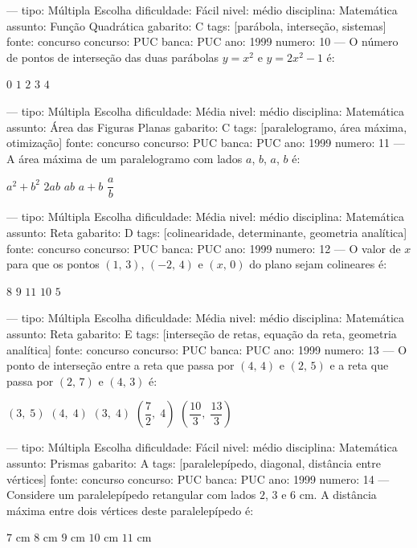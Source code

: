 ---
tipo: Múltipla Escolha
dificuldade: Fácil
nivel: médio
disciplina: Matemática
assunto: Função Quadrática
gabarito: C
tags: [parábola, interseção, sistemas]
fonte: concurso
concurso: PUC
banca: PUC
ano: 1999
numero: 10
---
\question
O número de pontos de interseção das duas parábolas $y = x^2$ e $y = 2x^2 - 1$ é:
\begin{choices}
\choice $0$
\choice $1$
\CorrectChoice $2$
\choice $3$
\choice $4$
\end{choices}

---
tipo: Múltipla Escolha
dificuldade: Média
nivel: médio
disciplina: Matemática
assunto: Área das Figuras Planas
gabarito: C
tags: [paralelogramo, área máxima, otimização]
fonte: concurso
concurso: PUC
banca: PUC
ano: 1999
numero: 11
---
\question
A área máxima de um paralelogramo com lados $a$, $b$, $a$, $b$ é:
\begin{choices}
\choice $a^2 + b^2$
\choice $2ab$
\CorrectChoice $ab$
\choice $a + b$
\choice $\dfrac{a}{b}$
\end{choices}

---
tipo: Múltipla Escolha
dificuldade: Média
nivel: médio
disciplina: Matemática
assunto: Reta
gabarito: D
tags: [colinearidade, determinante, geometria analítica]
fonte: concurso
concurso: PUC
banca: PUC
ano: 1999
numero: 12
---
\question
O valor de $x$ para que os pontos $(1,\,3)$, $(-2,\,4)$ e $(x,\,0)$ do plano sejam colineares é:
\begin{choices}
\choice $8$
\choice $9$
\choice $11$
\CorrectChoice $10$
\choice $5$
\end{choices}

---
tipo: Múltipla Escolha
dificuldade: Média
nivel: médio
disciplina: Matemática
assunto: Reta
gabarito: E
tags: [interseção de retas, equação da reta, geometria analítica]
fonte: concurso
concurso: PUC
banca: PUC
ano: 1999
numero: 13
---
\question
O ponto de interseção entre a reta que passa por $(4,\,4)$ e $(2,\,5)$ e a reta que passa por $(2,\,7)$ e $(4,\,3)$ é:
\begin{choices}
\choice $(3,\;5)$
\choice $(4,\;4)$
\choice $(3,\;4)$
\choice $\left(\dfrac{7}{2},\;4\right)$
\CorrectChoice $\left(\dfrac{10}{3},\;\dfrac{13}{3}\right)$
\end{choices}

---
tipo: Múltipla Escolha
dificuldade: Fácil
nivel: médio
disciplina: Matemática
assunto: Prismas
gabarito: A
tags: [paralelepípedo, diagonal, distância entre vértices]
fonte: concurso
concurso: PUC
banca: PUC
ano: 1999
numero: 14
---
\question
Considere um paralelepípedo retangular com lados $2$, $3$ e $6$ cm. A distância máxima entre dois vértices deste paralelepípedo é:
\begin{choices}
\CorrectChoice $7$ cm
\choice $8$ cm
\choice $9$ cm
\choice $10$ cm
\choice $11$ cm
\end{choices}


